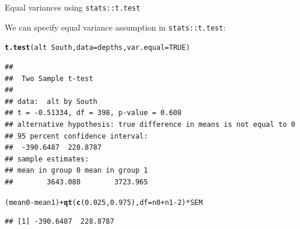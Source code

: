 \documentclass{beamer}\usepackage[]{graphicx}\usepackage[]{color}
\newcommand{\hlnum}[1]{\textcolor[rgb]{0.686,0.059,0.569}{#1}}%
\newcommand{\hlopt}[1]{\textcolor[rgb]{0,0,0}{#1}}%
\newcommand{\hlstd}[1]{\textcolor[rgb]{0.345,0.345,0.345}{#1}}%
\newcommand{\hlkwc}[1]{\textcolor[rgb]{0.333,0.667,0.333}{#1}}%
\newcommand{\hlkwd}[1]{\textcolor[rgb]{0.737,0.353,0.396}{\textbf{#1}}}%
\newenvironment{knitrout}{}{} %
\begin{document}
\begin{frame}[fragile]{Equal variances using \texttt{stats::t.test}}

We can specify equal variance assumption in \texttt{stats::t.test}:

\begin{knitrout}\scriptsize
{}\color{fgcolor}
\begin{alltt}
\hlkwd{t.test}\hlstd{(alt} \hlopt{~} \hlstd{South,} \hlkwc{data} \hlstd{= depths,} \hlkwc{var.equal} \hlstd{=} \hlnum{TRUE}\hlstd{)}
\end{alltt}
\begin{verbatim}
## 
## 	Two Sample t-test
## 
## data:  alt by South
## t = -0.51334, df = 398, p-value = 0.608
## alternative hypothesis: true difference in means is not equal to 0
## 95 percent confidence interval:
##  -390.6487  228.8787
## sample estimates:
## mean in group 0 mean in group 1 
##        3643.080        3723.965
\end{verbatim}
\begin{alltt}
\hlstd{(mean0} \hlopt{-} \hlstd{mean1)} \hlopt{+} \hlkwd{qt}\hlstd{(}\hlkwd{c}\hlstd{(}\hlnum{0.025}\hlstd{,} \hlnum{0.975}\hlstd{),} \hlkwc{df} \hlstd{= n0} \hlopt{+} \hlstd{n1} \hlopt{-} \hlnum{2}\hlstd{)} \hlopt{*} \hlstd{SEM}
\end{alltt}
\begin{verbatim}
## [1] -390.6487  228.8787
\end{verbatim}

\end{knitrout}


\end{frame}
\end{document}
